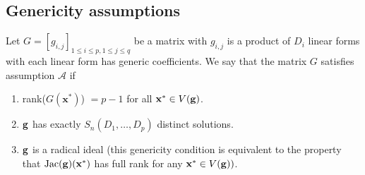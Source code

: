 \documentclass[11pt]{article}
\numberwithin{Property}{section}
\numberwithin{Theorem}{section}
\numberwithin{Proposition}{section}
\numberwithin{Lemma}{section}
\numberwithin{Corollary}{section}
\numberwithin{Definition}{section}
\numberwithin{Remark}{section}
\numberwithin{Conjecture}{section}
\numberwithin{Problem}{section}
\numberwithin{Claim}{section}
\theoremstyle{definition}
\numberwithin{Example}{section}
\renewcommand{\leq}{\leqslant}
\begin{document}
\subsection{Genericity assumptions}
\label{subsec:genericity}
Let $G = [g_{i,j}]_{1 \leq i \leq p, 1 \leq j \leq q}$ be a matrix with $g_{i,j}$ is a product of $D_i$ linear forms with each linear form has generic coefficients. We say that the matrix $G$ satisfies assumption $\mathcal{A}$ if 
\begin{enumerate}
\item rank($G(\mathbf{x}^*)$) $= p-1$ for all $\mathbf{x}^* \in V({\bf g})$.
\item ${\bf g}$ has exactly $S_{n}(D_1, \ldots, D_p)$ distinct solutions.  
\item ${\bf g}$ is a radical ideal (this genericity condition is equivalent to the property that $\mathrm{Jac}({\bf g})(\mathbf{x}^*)$ has full rank for any $\mathbf{x}^* \in V({\bf g}))$. 
\end{enumerate}
\end{document}
